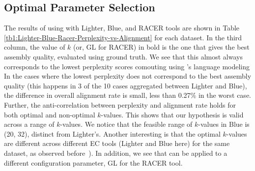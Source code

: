 
\vspace{-8pt}
\subsection{Optimal Parameter Selection}
\vspace{-8pt}
The results of using \name with Lighter, Blue, and RACER tools are shown in Table \ref{tb1:Lighter-Blue-Racer-Perplexity-vs-Alignment} for each dataset. In the third column, the value of $k$ (or, GL for RACER) in bold is the one that gives the best assembly quality, evaluated using ground truth. We see that this almost always corresponds to the lowest perplexity scores comouting using \name's language modeling %
In the cases where the lowest perplexity does not correspond to the best assembly quality (this happens in 3 of the 10 cases aggregated between Lighter and Blue), the difference in overall alignment rate is small, less than 0.27\% in the worst case.  
Further, the anti-correlation between perplexity and alignment rate holds for both optimal and non-optimal $k$-values. 
This shows that our hypothesis is valid across a range of $k$-values. We notice that the feasible range of $k$-values in Blue is (20, 32), distinct from Lighter's. Another interesting is that the optimal $k$-values are different across different EC tools (Lighter and Blue here) for the same dataset, as observed before~\cite{song2014lighter}). 
In addition, we see that \name can be applied to a different configuration parameter, GL for the RACER tool.


